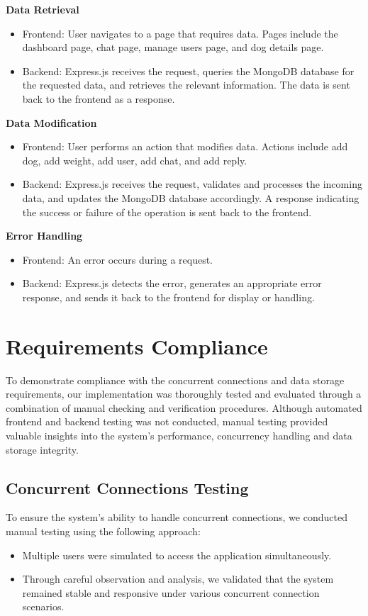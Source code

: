 \textbf{Data Retrieval}
\begin{itemize}
    \item Frontend: User navigates to a page that requires data. Pages include the dashboard page, chat page, manage users page, and dog details page.
    \item Backend: Express.js receives the request, queries the MongoDB database for the requested data, and retrieves the relevant information. The data is sent back to the frontend as a response.
\end{itemize}

\textbf{Data Modification}
\begin{itemize}
    \item Frontend: User performs an action that modifies data. Actions include add dog, add weight, add user, add chat, and add reply.
    \item Backend: Express.js receives the request, validates and processes the incoming data, and updates the MongoDB database accordingly. A response indicating the success or failure of the operation is sent back to the frontend.
\end{itemize}

\textbf{Error Handling}
\begin{itemize}
    \item Frontend: An error occurs during a request.
    \item Backend: Express.js detects the error, generates an appropriate error response, and sends it back to the frontend for display or handling.
\end{itemize}

\section{Requirements Compliance}
To demonstrate compliance with the concurrent connections and data storage requirements, our implementation was thoroughly tested and evaluated through a combination of manual checking and verification procedures. Although automated frontend and backend testing was not conducted, manual testing provided valuable insights into the system’s performance, concurrency handling and data storage integrity.

\subsection{Concurrent Connections Testing}
To ensure the system’s ability to handle concurrent connections, we conducted manual testing using the following approach:
\begin{itemize}
    \item Multiple users were simulated to access the application simultaneously.
    \item Through careful observation and analysis, we validated that the system remained stable and responsive under various concurrent connection scenarios.
\end{itemize}

